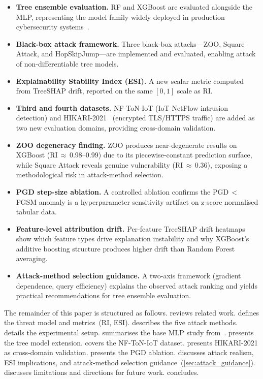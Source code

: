 \documentclass[runningheads]{llncs}
\begin{document}
\begin{itemize}
  \item \textbf{Tree ensemble evaluation.}  RF and XGBoost are evaluated alongside
    the MLP, representing the model family widely deployed in production
    cybersecurity systems~\cite{apruzzese2022modeling}.
  \item \textbf{Black-box attack framework.}  Three black-box attacks---ZOO,
    Square Attack, and HopSkipJump---are implemented and evaluated, enabling
    attack of non-differentiable tree models.
  \item \textbf{Explainability Stability Index (ESI).}  A new scalar metric
    computed from TreeSHAP drift, reported on the same $[0,1]$ scale as RI.
  \item \textbf{Third and fourth datasets.}  NF-ToN-IoT (IoT NetFlow intrusion
    detection) and HIKARI-2021~\cite{ferrag2022hikari} (encrypted TLS/HTTPS traffic)
    are added as two new evaluation domains, providing cross-domain validation.
  \item \textbf{ZOO degeneracy finding.}  ZOO produces near-degenerate results
    on XGBoost (RI\,$\approx$\,0.98--0.99) due to its piece\-wise-constant prediction surface,
    while Square Attack reveals genuine vulnerability (RI\,$\approx$\,0.36), exposing a
    methodological risk in attack-method selection.
  \item \textbf{PGD step-size ablation.}  A controlled ablation confirms the
    PGD\,$<$\,FGSM anomaly is a hyperparameter sensitivity artifact on
    z-score normalised tabular data.
  \item \textbf{Feature-level attribution drift.}  Per-feature TreeSHAP drift
    heatmaps show which feature types drive explanation instability and why
    XGBoost's additive boosting structure produces higher drift than Random Forest
    averaging.
  \item \textbf{Attack-method selection guidance.}  A two-axis framework
    (gradient dependence, query efficiency) explains the observed attack ranking
    and yields practical recommendations for tree ensemble evaluation.
\end{itemize}

The remainder of this paper is structured as follows.
 reviews related work.
 defines the threat model and metrics~(RI, ESI).
 describes the five attack methods.
 details the experimental setup.
 summarises the base MLP study from~\cite{khawarey2026empirical}.
 presents the tree model extension.
 covers the NF-ToN-IoT dataset.
 presents HIKARI-2021 as cross-domain validation.
 presents the PGD ablation.
 discusses attack realism, ESI implications, and
attack-method selection guidance~(\cref{sec:attack_guidance}).
 discusses limitations and directions for future work.
 concludes.
\end{document}
